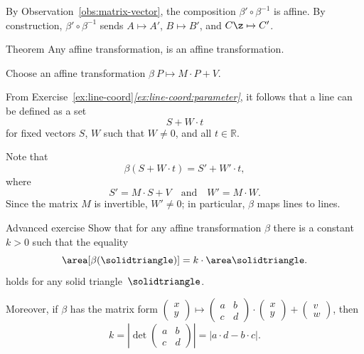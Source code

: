 By Observation~\ref{obs:matrix-vector}, the composition $\beta'\circ\beta^{-1}$ is affine.
By construction, $\beta'\circ\beta^{-1}$ sends $A\mapsto A'$, $B\mapsto B'$, and $C\z\mapsto C'$.
\qeds


\begin{thm}{Theorem}\label{thm:affine=linear}
Any affine transformation, is an affine transformation.
\end{thm}

Choose an affine transformation $\beta\:P
\mapsto
M
\cdot P
+
V$.

From Exercise~\ref{ex:line-coord}\textit{\ref{ex:line-coord:parameter}}, it follows that a line can be defined as a set  
\[S+W \cdot t\]
for fixed vectors $S$, $W$ such that $W\ne 0$, and all $t\in\mathbb{R}$.

Note that 
\[\beta\left(S+W \cdot t\right)
=
S'+W' \cdot t
,\]
where 
\[S'=M\cdot S +V
\quad\text{and}\quad
W'=M\cdot W.
\]
Since the matrix $M$ is invertible, $W'\ne 0$; 
in particular, $\beta$ maps lines to lines.
\qeds



















\begin{thm}{Advanced exercise}\label{ex:area-affine}
Show that for any affine transformation $\beta$ there is a constant $k>0$
such that the equality 
\[\area[\beta(\solidtriangle)]=k\cdot\area\solidtriangle.\]
holds for any solid triangle~$\solidtriangle$.

Moreover, if $\beta$ has the matrix form $\left(\begin{smallmatrix}
x\\ y
\end{smallmatrix} \right)
  \mapsto
  \left(\begin{smallmatrix}
a&b\\ c&d
\end{smallmatrix} \right)
  \cdot
  \left(\begin{smallmatrix}
x\\ y
\end{smallmatrix} \right)
  +
\left(\begin{smallmatrix}
v\\ w
\end{smallmatrix} \right)$,
then 
\[k=|\det\left(\begin{smallmatrix}
a&b\\ c&d
\end{smallmatrix} \right)|=|a\cdot d-b\cdot c|.\]

\end{thm}

















